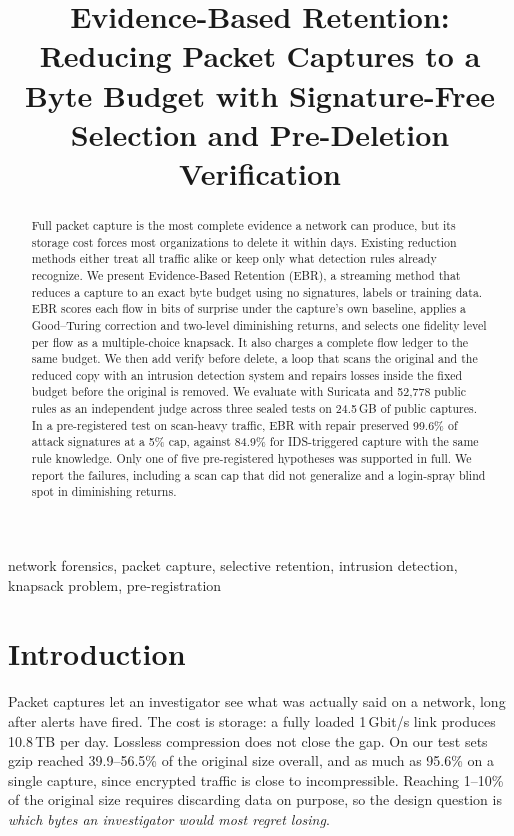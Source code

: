 \documentclass[conference]{IEEEtran}
\begin{document}
\title{Evidence-Based Retention: Reducing Packet Captures to a Byte Budget with Signature-Free Selection and Pre-Deletion Verification}

\author{
}

\maketitle

\begin{abstract}
Full packet capture is the most complete evidence a network can produce, but its storage cost forces most organizations to delete it within days. Existing reduction methods either treat all traffic alike or keep only what detection rules already recognize. We present Evidence-Based Retention (EBR), a streaming method that reduces a capture to an exact byte budget using no signatures, labels or training data. EBR scores each flow in bits of surprise under the capture's own baseline, applies a Good--Turing correction and two-level diminishing returns, and selects one fidelity level per flow as a multiple-choice knapsack. It also charges a complete flow ledger to the same budget. We then add verify before delete, a loop that scans the original and the reduced copy with an intrusion detection system and repairs losses inside the fixed budget before the original is removed. We evaluate with Suricata and 52,778 public rules as an independent judge across three sealed tests on 24.5\,GB of public captures. In a pre-registered test on scan-heavy traffic, EBR with repair preserved 99.6\% of attack signatures at a 5\% cap, against 84.9\% for IDS-triggered capture with the same rule knowledge. Only one of five pre-registered hypotheses was supported in full. We report the failures, including a scan cap that did not generalize and a login-spray blind spot in diminishing returns.
\end{abstract}

\begin{IEEEkeywords}
network forensics, packet capture, selective retention, intrusion detection, knapsack problem, pre-registration
\end{IEEEkeywords}

\section{Introduction}
Packet captures let an investigator see what was actually said on a network, long after alerts have fired. The cost is storage: a fully loaded 1\,Gbit/s link produces 10.8\,TB per day. Lossless compression does not close the gap. On our test sets gzip reached 39.9--56.5\% of the original size overall, and as much as 95.6\% on a single capture, since encrypted traffic is close to incompressible. Reaching 1--10\% of the original size requires discarding data on purpose, so the design question is \emph{which bytes an investigator would most regret losing}.
\end{document}
